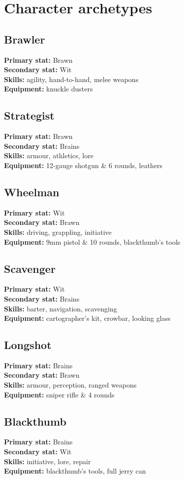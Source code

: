\documentclass[10pt, a4paper, twocolumn]{article}
\begin{document}
\section{Character archetypes}
\begin{multicols}{2}
\subsection{Brawler}
\textbf{Primary stat:} Brawn\\
\textbf{Secondary stat:} Wit\\
\textbf{Skills:} agility, hand-to-hand, melee weapons\\
\textbf{Equipment:} knuckle dusters
\subsection{Strategist}
\textbf{Primary stat:} Brawn\\
\textbf{Secondary stat:} Brains\\
\textbf{Skills:} armour, athletics, lore\\
\textbf{Equipment:} 12-gauge shotgun \& 6 rounds, leathers
\end{multicols}
\begin{multicols}{2}
\subsection{Wheelman}
\textbf{Primary stat:} Wit\\
\textbf{Secondary stat:} Brawn\\
\textbf{Skills:} driving, grappling, initiative\\
\textbf{Equipment:} 9mm pistol \& 10 rounds, blackthumb's tools
\subsection{Scavenger}
\textbf{Primary stat:} Wit\\
\textbf{Secondary stat:} Brains\\
\textbf{Skills:} barter, navigation, scavenging\\
\textbf{Equipment:} cartographer's kit, crowbar, looking glass
\end{multicols}
\begin{multicols}{2}
\subsection{Longshot}
\textbf{Primary stat:} Brains\\
\textbf{Secondary stat:} Brawn\\
\textbf{Skills:} armour, perception, ranged weapons\\
\textbf{Equipment:} sniper rifle \& 4 rounds
\subsection{Blackthumb}
\textbf{Primary stat:} Brains\\
\textbf{Secondary stat:} Wit\\
\textbf{Skills:} initiative, lore, repair\\
\textbf{Equipment:} blackthumb's tools, full jerry can
\end{multicols}
\end{document}

